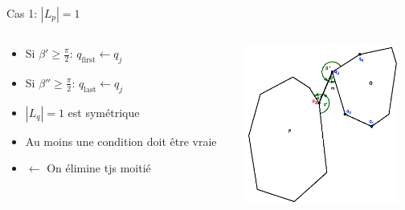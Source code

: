 \documentclass{beamer}
\begin{document}
\begin{frame}{Cas 1: $|L_p| = 1$}
	\begin{columns}[c]
	\begin{column}[T]{.5\textwidth}
		\begin{itemize}
		\item Si $\beta' \geq \frac{\pi}{2}$: $q_{\text{first}} \leftarrow q_{j}$
		\item Si $\beta'' \geq \frac{\pi}{2}$: $q_{\text{last}} \leftarrow q_{j}$
		\item $|L_q| = 1$ est symétrique
		\item Au moins une condition doit être vraie
		\item $\leftarrow$ On élimine tjs moitié
		\end{itemize}
	\end{column}
	\begin{column}[T]{.5\textwidth}
		\includegraphics[width=5cm]{dmin1.eps}
	\end{column}
	\end{columns}
\end{frame}
\end{document}
